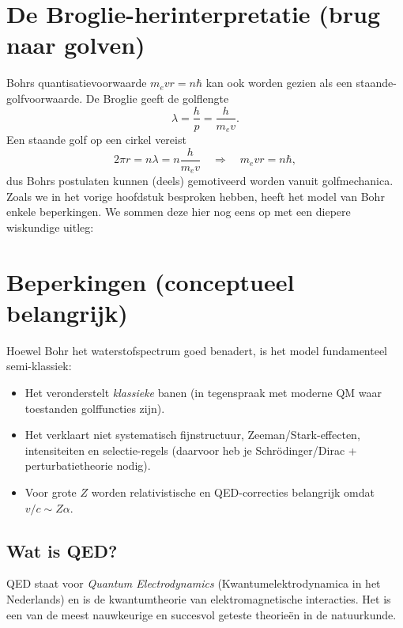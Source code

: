 \documentclass{report} %
\begin{document}
    \section{De Broglie-herinterpretatie (brug naar golven)}
    Bohrs quantisatievoorwaarde $m_e v r = n\hbar$ kan ook worden gezien als een staande-golfvoorwaarde.
    De Broglie geeft de golflengte
    \[
        \lambda = \frac{h}{p}=\frac{h}{m_e v}.
    \]
    Een staande golf op een cirkel vereist
    \[
        2\pi r = n\lambda = n\frac{h}{m_e v}
        \quad\Longrightarrow\quad
        m_e v r = n\hbar,
    \]
    dus Bohrs postulaten kunnen (deels) gemotiveerd worden vanuit golfmechanica.\\
    Zoals we in het vorige hoofdstuk besproken hebben, heeft het model van Bohr enkele beperkingen.
    We sommen deze hier nog eens op met een diepere wiskundige uitleg:


    \section{Beperkingen (conceptueel belangrijk)}
    Hoewel Bohr het waterstofspectrum goed benadert, is het model fundamenteel semi-klassiek:
    \begin{itemize}
        \item Het veronderstelt \emph{klassieke} banen (in tegenspraak met moderne QM waar toestanden golffuncties zijn).
        \item Het verklaart niet systematisch fijnstructuur, Zeeman/Stark-effecten, intensiteiten en selectie-regels
        (daarvoor heb je Schr\"odinger/Dirac + perturbatietheorie nodig).
        \item Voor grote $Z$ worden relativistische en QED-correcties belangrijk omdat $v/c\sim Z\alpha$.
    \end{itemize}

    \subsection{Wat is QED?}
    QED staat voor \emph{Quantum Electrodynamics} (Kwantumelektrodynamica in het Nederlands) en is de kwantumtheorie van elektromagnetische interacties.
    Het is een van de meest nauwkeurige en succesvol geteste theorieën in de natuurkunde.
\end{document}
